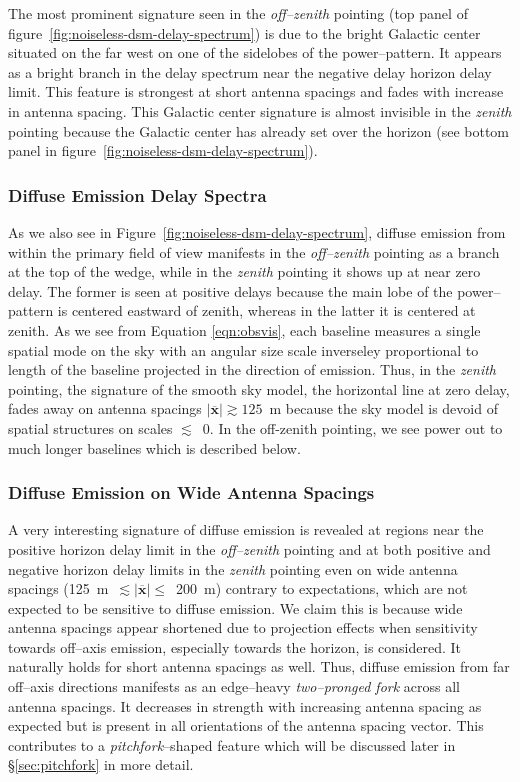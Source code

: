 \documentclass[preprint2,iop,numberedappendix]{emulateapj}
\begin{document}
The most prominent signature seen in the {\it off--zenith} pointing (top panel of figure~\ref{fig:noiseless-dsm-delay-spectrum}) is due to the bright Galactic center situated on the far west on one of the sidelobes of the power--pattern. It appears as a bright branch in the delay spectrum near the negative delay horizon delay limit. This feature is strongest at short antenna spacings and fades with increase in antenna spacing. This Galactic center signature is almost invisible in the {\it zenith} pointing because the Galactic center has already set over the horizon (see bottom panel in figure~\ref{fig:noiseless-dsm-delay-spectrum}). 

\subsubsection{Diffuse Emission Delay Spectra}\label{sec:diffuse-features}

As we also see in Figure~\ref{fig:noiseless-dsm-delay-spectrum}, diffuse emission from within the primary field of view manifests in the {\it off--zenith} pointing as a branch at the top of the wedge, while in the {\it zenith} pointing it shows up at near zero delay. The former is seen at positive delays because the main lobe of the power--pattern is centered eastward of zenith, whereas in the latter it is centered at zenith. As we see from Equation \ref{eqn:obsvis}, each baseline measures a single spatial mode on the sky with an angular size scale inverseley proportional to length of the baseline projected in the direction of emission. Thus, in the {\it zenith} pointing, the signature of the smooth sky model, the horizontal line at zero delay, fades away on antenna spacings $|\overline{\mathbf{x}}| \gtrsim 125$~m because the sky model is devoid of spatial structures on scales $\lesssim$~0. In the off-zenith pointing, we see power out to much longer baselines which is described below.

\subsubsection{Diffuse Emission on Wide Antenna Spacings}\label{sec:diffuse-long-baselines}

A very interesting signature of diffuse emission is revealed at regions near the positive horizon delay limit in the {\it off--zenith} pointing and at both positive and negative horizon delay limits in the {\it zenith} pointing even on wide antenna spacings (125~m~$\lesssim |\overline{\mathbf{x}}|\le$~200~m) contrary to expectations, which are not expected to be sensitive to diffuse emission. We claim this is because wide antenna spacings appear shortened due to projection effects when sensitivity towards off--axis emission, especially towards the horizon, is considered. It naturally holds for short antenna spacings as well. Thus, diffuse emission from far off--axis directions manifests as an edge--heavy {\it two--pronged fork} across all antenna spacings. It decreases in strength with increasing antenna spacing as expected but is present in all orientations of the antenna spacing vector. This contributes to a {\it pitchfork}--shaped feature which will be discussed later in \S\ref{sec:pitchfork} in more detail.
\end{document}
